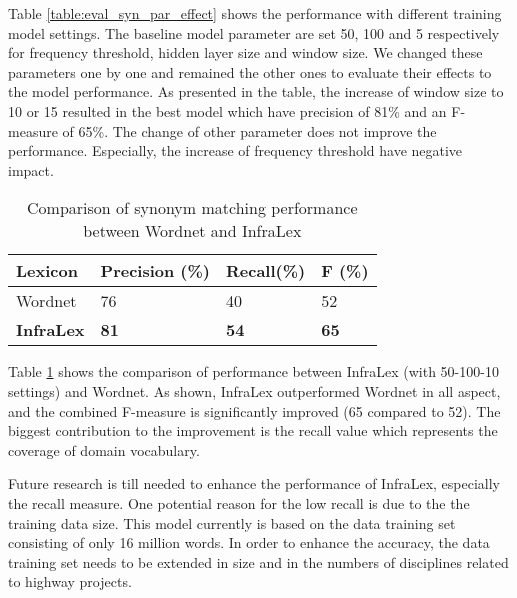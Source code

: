 \documentclass[Journal, InsideFigs, DoubleSpace]{ascelike} %
\begin{document}
\par
Table \ref{table:eval_syn_par_effect} shows the performance with different training model settings. The baseline model parameter are set 50, 100 and 5 respectively for frequency threshold, hidden layer size and window size. We changed these parameters one by one and remained the other ones to evaluate their effects to the model performance. As presented in the table, the increase of window size to 10 or 15 resulted in the best model which have precision of 81\% and an F-measure of 65\%. The change of other parameter does not improve the performance. Especially, the increase of frequency threshold have negative impact. 
%
\begin{table} [b] 
	\caption{Comparison of synonym matching performance between Wordnet and InfraLex}
	\label{table:eval_syn_vs_Wordnet}
	\centering
	\small
	\renewcommand{\arraystretch}{1.25}
	\begin{tabular}{l l l l }
		\hline
		\hline
		\textbf{Lexicon} & \textbf{Precision (\%)}  & \textbf{Recall(\%)} & \textbf{F (\%)}\\
		\hline
		Wordnet	&76 	&40 	&52\\	
		\textbf{InfraLex} &\textbf{81}	&\textbf{54}		&\textbf{65}\\	
		\hline
		\hline
	\end{tabular}
	\normalsize
\end{table}
\par
Table \ref{table:eval_syn_vs_Wordnet} shows the comparison of performance between InfraLex (with 50-100-10 settings) and Wordnet. As shown, InfraLex outperformed Wordnet in all aspect, and the combined F-measure is significantly improved (65 compared to 52). The biggest contribution to the improvement is the recall value which represents the coverage of domain vocabulary. 
\par
Future research is till needed to enhance the performance of InfraLex, especially the recall measure. One potential reason for the low recall is due to the the training data size. This model currently is based on the data training set consisting of only 16 million words. In order to enhance the accuracy, the data training set needs to be extended in size and in the numbers of disciplines related to highway projects. 
%
\end{document}
